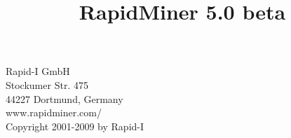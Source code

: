 \documentclass{rapidminertutorial}
\title{
  {\Huge RapidMiner 5.0 beta}
}
\begin{document}
\maketitle

\pagebreak 

Rapid-I GmbH\\
Stockumer Str. 475 \\
44227 Dortmund, Germany \\
\http www.rapidminer.com/ \\[1cm]

Copyright 2001-2009 by Rapid-I


\pagebreak

\tableofcontents
\listoffigures
\listoftables





















\begin{appendix}



\end{appendix}

 


\printindex
\end{document}
